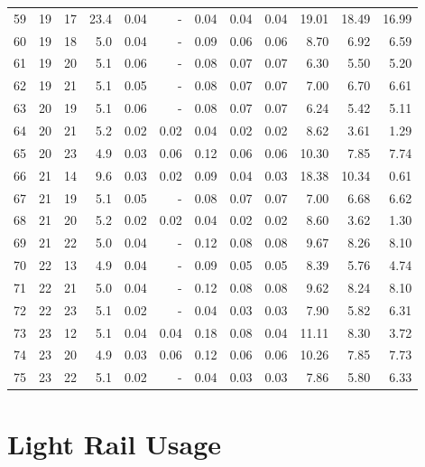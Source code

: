 \begin{small}
\begin{longtable}[c]{lrrrrr|rrr|rrr}
59 & 19 & 17 & 23.4 & 0.04 & - & 0.04 & 0.04 & 0.04 & 19.01 & 18.49 & 16.99 \\
60 & 19 & 18 & 5.0 & 0.04 & - & 0.09 & 0.06 & 0.06 & 8.70 & 6.92 & 6.59 \\
61 & 19 & 20 & 5.1 & 0.06 & - & 0.08 & 0.07 & 0.07 & 6.30 & 5.50 & 5.20 \\
62 & 19 & 21 & 5.1 & 0.05 & - & 0.08 & 0.07 & 0.07 & 7.00 & 6.70 & 6.61 \\
63 & 20 & 19 & 5.1 & 0.06 & - & 0.08 & 0.07 & 0.07 & 6.24 & 5.42 & 5.11 \\
64 & 20 & 21 & 5.2 & 0.02 & 0.02 & 0.04 & 0.02 & 0.02 & 8.62 & 3.61 & 1.29 \\
65 & 20 & 23 & 4.9 & 0.03 & 0.06 & 0.12 & 0.06 & 0.06 & 10.30 & 7.85 & 7.74 \\
66 & 21 & 14 & 9.6 & 0.03 & 0.02 & 0.09 & 0.04 & 0.03 & 18.38 & 10.34 & 0.61 \\
67 & 21 & 19 & 5.1 & 0.05 & - & 0.08 & 0.07 & 0.07 & 7.00 & 6.68 & 6.62 \\
68 & 21 & 20 & 5.2 & 0.02 & 0.02 & 0.04 & 0.02 & 0.02 & 8.60 & 3.62 & 1.30 \\
69 & 21 & 22 & 5.0 & 0.04 & - & 0.12 & 0.08 & 0.08 & 9.67 & 8.26 & 8.10 \\
70 & 22 & 13 & 4.9 & 0.04 & - & 0.09 & 0.05 & 0.05 & 8.39 & 5.76 & 4.74 \\
71 & 22 & 21 & 5.0 & 0.04 & - & 0.12 & 0.08 & 0.08 & 9.62 & 8.24 & 8.10 \\
72 & 22 & 23 & 5.1 & 0.02 & - & 0.04 & 0.03 & 0.03 & 7.90 & 5.82 & 6.31 \\
73 & 23 & 12 & 5.1 & 0.04 & 0.04 & 0.18 & 0.08 & 0.04 & 11.11 & 8.30 & 3.72 \\
74 & 23 & 20 & 4.9 & 0.03 & 0.06 & 0.12 & 0.06 & 0.06 & 10.26 & 7.85 & 7.73 \\
75 & 23 & 22 & 5.1 & 0.02 & - & 0.04 & 0.03 & 0.03 & 7.86 & 5.80 & 6.33 \\ \bottomrule
\end{longtable}
\end{small}


\newpage
\section{Light Rail Usage}

